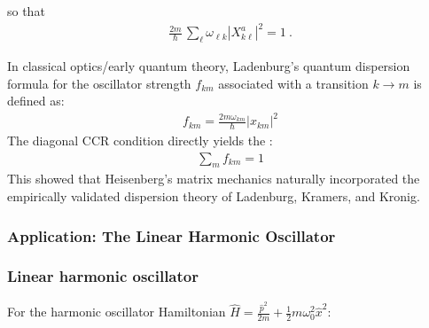 \documentclass[letterpaper,10pt,english]{jupyterBook}
\begin{document}
\sphinxAtStartPar
so that
\begin{equation*}
\begin{split}
 \frac{2 m}{\hbar} \, \sum_{\ell} \omega_{\ell k} \left| X^{a}_{k \ell} \right|^2  = 1 \ .
\end{split}
\end{equation*}
\sphinxAtStartPar
{} 

\sphinxAtStartPar
{}
In classical optics/early quantum theory, Ladenburg’s quantum dispersion formula for the oscillator strength \(f_{km}\) associated with a transition \(k \to m\) is defined as:
\begin{equation*}
\begin{split}f_{km} = \frac{2m \omega_{km}}{\hbar} |x_{km}|^2\end{split}
\end{equation*}
\sphinxAtStartPar
The diagonal CCR condition directly yields the :
\begin{equation*}
\begin{split}\sum_m f_{km} = 1\end{split}
\end{equation*}
\sphinxAtStartPar
This showed that Heisenberg’s matrix mechanics naturally incorporated the empirically validated dispersion theory of Ladenburg, Kramers, and Kronig.


\subsubsection{Application: The Linear Harmonic Oscillator}
\label{\detokenize{ch/quantum-mechanics/history/heisenberg-reinterpretation:application-the-linear-harmonic-oscillator}}\label{\detokenize{ch/quantum-mechanics/history/heisenberg-reinterpretation:quantum-mechanics-history-heisenberg-reinterpretation-linear-harmonic-oscillator}}\subsubsection*{Linear harmonic oscillator}

\sphinxAtStartPar
For the harmonic oscillator Hamiltonian \(\hat{H} = \frac{\hat{p}^2}{2m} + \frac{1}{2}m\omega_0^2 \hat{x}^2\):
\end{document}
